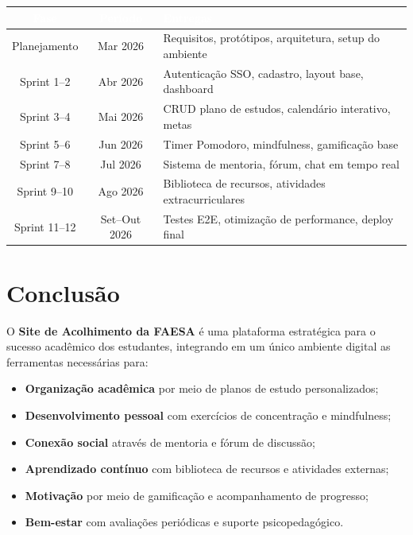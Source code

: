 \documentclass[12pt, a4paper]{article}
\begin{document}
\begin{center}
\begin{tabularx}{\textwidth}{|c|c|X|}
\hline
\rowcolor{faesaAzul}
\textcolor{white}{\textbf{Fase}} & \textcolor{white}{\textbf{Período}} & \textcolor{white}{\textbf{Entregas}} \\
\hline
Planejamento & Mar 2026 & Requisitos, protótipos, arquitetura, setup do ambiente \\
\hline
Sprint 1--2 & Abr 2026 & Autenticação SSO, cadastro, layout base, dashboard \\
\hline
Sprint 3--4 & Mai 2026 & CRUD plano de estudos, calendário interativo, metas \\
\hline
Sprint 5--6 & Jun 2026 & Timer Pomodoro, mindfulness, gamificação base \\
\hline
Sprint 7--8 & Jul 2026 & Sistema de mentoria, fórum, chat em tempo real \\
\hline
Sprint 9--10 & Ago 2026 & Biblioteca de recursos, atividades extracurriculares \\
\hline
Sprint 11--12 & Set--Out 2026 & Testes E2E, otimização de performance, deploy final \\
\hline
\end{tabularx}
\end{center}

\newpage
\section{Conclusão}

O \textbf{Site de Acolhimento da FAESA} é uma plataforma estratégica para o sucesso acadêmico dos estudantes, integrando em um único ambiente digital as ferramentas necessárias para:

\begin{itemize}[leftmargin=2cm]
    \item[\faIcon{check-circle}] \textbf{Organização acadêmica} por meio de planos de estudo personalizados;
    \item[\faIcon{check-circle}] \textbf{Desenvolvimento pessoal} com exercícios de concentração e mindfulness;
    \item[\faIcon{check-circle}] \textbf{Conexão social} através de mentoria e fórum de discussão;
    \item[\faIcon{check-circle}] \textbf{Aprendizado contínuo} com biblioteca de recursos e atividades externas;
    \item[\faIcon{check-circle}] \textbf{Motivação} por meio de gamificação e acompanhamento de progresso;
    \item[\faIcon{check-circle}] \textbf{Bem-estar} com avaliações periódicas e suporte psicopedagógico.
\end{itemize}
\end{document}
